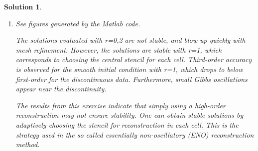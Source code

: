 \documentclass[10pt,letterpaper]{article}
\theoremstyle{break}
\newtheorem{solution}{Solution}
\begin{document}
\begin{solution}
\begin{enumerate}
		
		\item
		See figures generated by the Matlab code.
		
		The solutions evaluated with r=0,2 are not stable, and blow up quickly with mesh refinement. However, the solutions are stable with r=1, which corresponds to choosing the central stencil for each cell. Third-order accuracy is observed for the smooth initial condition with r=1, which drops to below first-order for the discontinuous data. Furthermore, small Gibbs oscillations appear near the discontinuity.
		
		The results from this exercise indicate that simply using a high-order reconstruction may not ensure stability. One can obtain stable solutions by adaptively choosing the stencil for reconstruction in each cell. This is the strategy used in the so called \textit{essentially non-oscillatory} (ENO) reconstruction method.
		
		
	\end{enumerate}
		
		
	
	
	
	
	
	
	
\end{solution}
\end{document}
